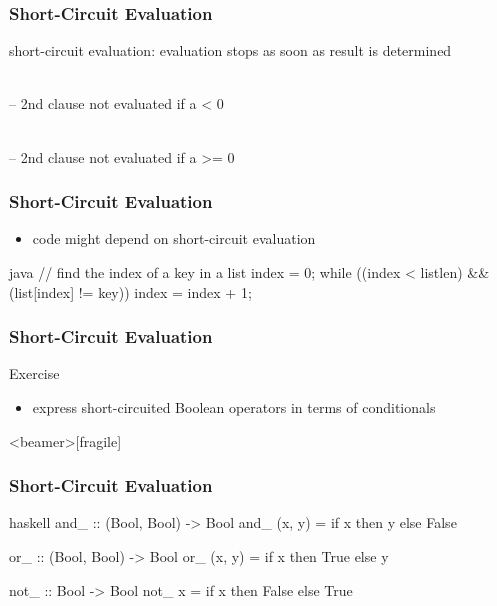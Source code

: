 \documentclass[dvipsnames]{beamer}
\theoremstyle{plain}
\begin{document}
\begin{frame}
  \frametitle{Short-Circuit Evaluation}

  \begin{definition}
    \alert{short-circuit evaluation}: evaluation stops
      as soon as result is determined
  \end{definition}

  \pause
  \begin{example}
    \\
    -- 2nd clause not evaluated if a < 0

    \bigskip
    \\
    -- 2nd clause not evaluated if a >= 0
  \end{example}
\end{frame}

\begin{frame}[fragile]
  \frametitle{Short-Circuit Evaluation}

  \begin{itemize}
    \item code might depend on short-circuit evaluation
  \end{itemize}

  \begin{example}[Java]
    \begin{pygments}{java}
// find the index of a key in a list
index = 0;
while ((index < listlen) && (list[index] != key))
    index = index + 1;
    \end{pygments}
  \end{example}
\end{frame}

\begin{frame}
  \frametitle{Short-Circuit Evaluation}

  \begin{block}{Exercise}
    \begin{itemize}
      \item express short-circuited Boolean operators in terms of conditionals
    \end{itemize}
  \end{block}
\end{frame}

\begin{frame}<beamer>[fragile]
  \frametitle{Short-Circuit Evaluation}

  \begin{example}[Haskell]
    \begin{pygments}{haskell}
and_ :: (Bool, Bool) -> Bool
and_ (x, y) = if x then y else False

or_ :: (Bool, Bool) -> Bool
or_ (x, y) = if x then True else y

not_ :: Bool -> Bool
not_ x = if x then False else True
    \end{pygments}
  \end{example}
\end{frame}
\end{document}
